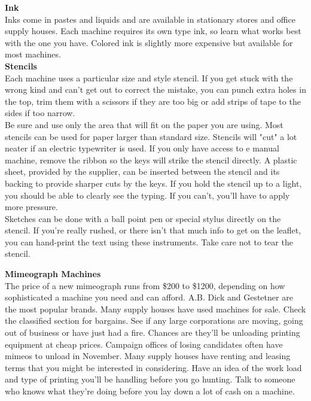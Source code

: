 \documentclass[11pt,twoside,a4paper]{book}
\begin{document}
\textbf{Ink}~\\
Inks come in pastes and liquids and are available in stationary stores and office supply houses. Each machine requires its own type ink, so learn what works best with the one you have. Colored ink is slightly more expensive but available for most machines.~\\

\textbf{Stencils}~\\
Each machine uses a particular size and style stencil. If you get stuck with the wrong kind and can't get out to correct the mistake, you can punch extra holes in the top, trim them with a scissors if they are too big or add strips of tape to the sides if too narrow.~\\

Be sure and use only the area that will fit on the paper you are using. Most stencils can be used for paper larger than standard size. Stencils will "cut" a lot neater if an electric typewriter is used. If you only have access to e manual machine, remove the ribbon so the keys will strike the stencil directly. A plastic sheet, provided by the supplier, can be inserted between the stencil and its backing to provide sharper cuts by the keys. If you hold the stencil up to a light, you should be able to clearly see the typing. If you can't, you'll have to apply more pressure.~\\

Sketches can be done with a ball point pen or special stylus directly on the stencil. If you're really rushed, or there isn't that much info to get on the leaflet, you can hand-print the text using these instruments. Take care not to tear the stencil.~\\

\clearpage

\textbf{Mimeograph Machines}~\\
The price of a new mimeograph runs from \$200 to \$1200, depending on how sophisticated a machine you need and can afford. A.B. Dick and Gestetner are the most popular brands. Many supply houses have used machines for sale. Check the classified section for bargains. See if any large corporations are moving, going out of business or have just had a fire. Chances are they'll be unloading printing equipment at cheap prices. Campaign offices of losing candidates often have mimeos to unload in November. Many supply houses have renting and leasing terms that you might be interested in considering. Have an idea of the work load and type of printing you'll be handling before you go hunting.  Talk to someone who knows what they're doing before you lay down a lot of cash on a machine.~\\
\end{document}
